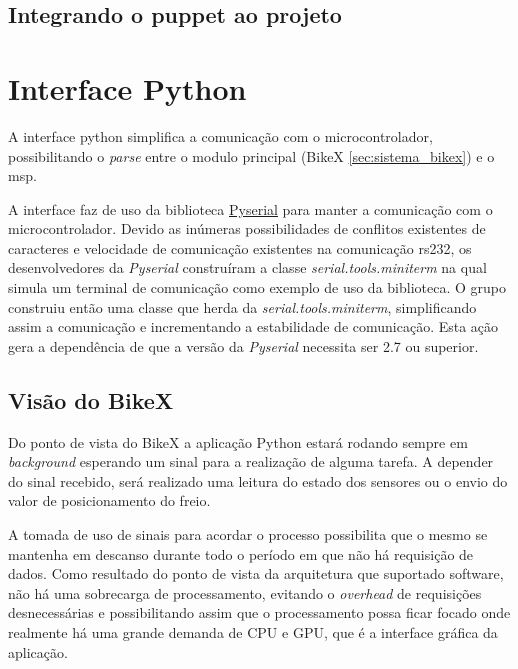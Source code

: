 \subsection{Integrando o puppet ao projeto} %
\label{sub:integrando_o_puppet_ao_projeto}


\section{Interface Python} %
\label{sec:interface_python}

A interface \gls{python} simplifica a comunicação com o microcontrolador, possibilitando o \textit{parse} entre o modulo principal (BikeX \ref{sec:sistema_bikex}) e o \gls{msp}.

A interface faz de uso da biblioteca \href{http://pyserial.sourceforge.net/pyserial.html}{Pyserial} para manter a comunicação com o microcontrolador. Devido as inúmeras possibilidades de conflitos existentes de caracteres e velocidade de comunicação existentes na comunicação \gls{rs232}, os desenvolvedores da \textit{Pyserial} construíram a classe \textit{serial.tools.miniterm} na qual simula um terminal de comunicação como exemplo de uso da biblioteca. O grupo construiu então uma classe que herda da \textit{serial.tools.miniterm}, simplificando assim a comunicação e incrementando a estabilidade de comunicação. Esta ação gera a dependência de que a versão da \textit{Pyserial} necessita ser 2.7 ou superior.

\subsection{Visão do BikeX} %
\label{sub:vis_o_do_bikex}

Do ponto de vista do BikeX a aplicação Python estará rodando sempre em \textit{background} esperando um sinal para a realização de alguma tarefa. A depender do sinal recebido, será realizado uma leitura do estado dos sensores ou o envio do valor de posicionamento do freio.

A tomada de uso de sinais para acordar o processo possibilita que o mesmo se mantenha em descanso durante todo o período em que não há requisição de dados. Como resultado do ponto de vista da arquitetura que suportado software, não há uma sobrecarga de processamento, evitando o \textit{overhead} de requisições desnecessárias e possibilitando assim que o processamento possa ficar focado onde realmente há uma grande demanda de CPU e GPU, que é a interface gráfica da aplicação.

